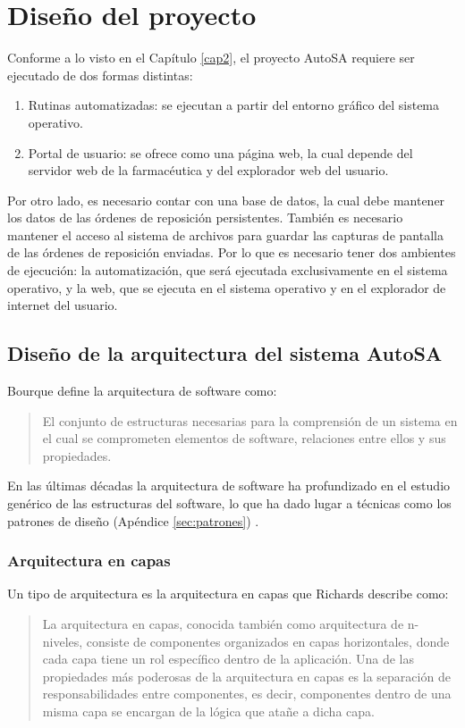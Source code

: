 \chapter{Diseño del proyecto}\label{cap3}
Conforme a lo visto en el Capítulo \ref{cap2}, el proyecto AutoSA requiere ser ejecutado de dos formas distintas:
\begin{enumerate}
 	\item Rutinas automatizadas: se ejecutan a partir del entorno gráfico del sistema operativo.
 	\item Portal de usuario: se ofrece como una página web, la cual depende del servidor web de la farmacéutica y del explorador web del usuario.
\end{enumerate}
Por otro lado, es necesario contar con una base de datos, la cual debe mantener los datos de las órdenes de reposición persistentes. También es necesario mantener el acceso al sistema de archivos para guardar las capturas de pantalla de las órdenes de reposición enviadas. Por lo que es necesario tener dos ambientes de ejecución: la automatización, que será ejecutada exclusivamente en el sistema operativo, y la web, que se ejecuta en el sistema operativo y en el explorador de internet del usuario.




\section{Diseño de la arquitectura del sistema AutoSA}
Bourque\cite{SWEBOOK} define la arquitectura de software como:
\begin{quote}
	El conjunto de estructuras necesarias para la comprensión de un sistema en el cual se comprometen elementos de software, relaciones entre ellos y sus propiedades.
\end{quote}
En las últimas décadas la arquitectura de software ha profundizado en el estudio genérico de las estructuras del software, lo que ha dado lugar a técnicas como los patrones de diseño (Apéndice \ref{sec:patrones}) \cite{SWEBOOK, SoftwareArchitectureInAction}.

\subsection{Arquitectura en capas}
Un tipo de arquitectura es la arquitectura en capas que Richards\cite{SoftwareArchitecturePatterns} describe como:
\begin{quote}
La arquitectura en capas, conocida también como arquitectura de n-niveles, consiste de componentes organizados en capas horizontales, donde cada capa tiene un rol específico dentro de la aplicación. Una de las propiedades más poderosas de la arquitectura en capas es la separación de responsabilidades entre componentes, es decir, componentes dentro de una misma capa se encargan de la lógica que atañe a dicha capa.
\end{quote}

